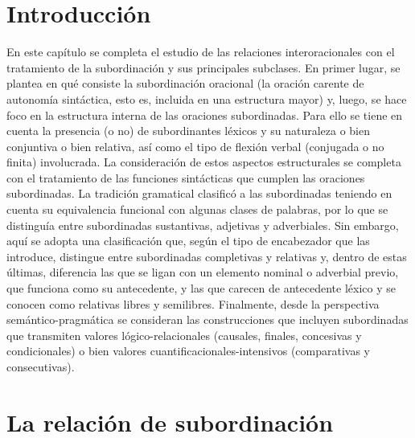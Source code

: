 %

\section{Introducción}

En este capítulo se completa el estudio de las relaciones interoracionales con el
tratamiento de la subordinación y sus principales subclases. En primer lugar, se
plantea en qué consiste la subordinación oracional (la oración carente de
autonomía sintáctica, esto es, incluida en una estructura
mayor) y,
luego, se hace foco en la estructura interna de las oraciones subordinadas. Para
ello se tiene en cuenta la presencia (o no) de subordinantes léxicos y su
naturaleza o bien conjuntiva o bien relativa, así como el tipo de flexión verbal
(conjugada o no finita) involucrada. La consideración de estos aspectos
estructurales se completa con el tratamiento de las funciones sintácticas que
cumplen las oraciones subordinadas. La tradición gramatical clasificó a las
subordinadas teniendo en cuenta su equivalencia funcional con algunas clases de
palabras, por lo que se distinguía entre subordinadas sustantivas, adjetivas y
adverbiales. Sin embargo, aquí se adopta una clasificación que, según el tipo de
encabezador que las introduce, distingue entre subordinadas completivas y
relativas y, dentro de estas últimas, diferencia las que se ligan con un elemento
nominal o adverbial previo, que funciona como su antecedente, y las que carecen
de antecedente léxico y se conocen como relativas libres y semilibres.
Finalmente, desde la perspectiva semántico-pragmática se consideran las
construcciones que incluyen subordinadas que transmiten valores
lógico-relacionales (causales, finales, concesivas y condicionales) o bien
valores cuantificacionales-intensivos (comparativas y consecutivas).

\section{La relación de subordinación}\label{sec:13-relacion}

